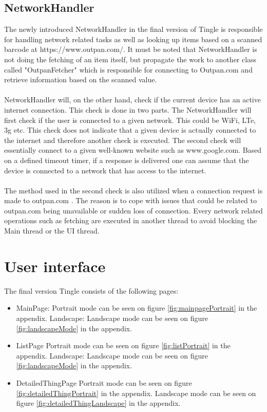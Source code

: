 \documentclass{article}
\begin{document}
\subsection{NetworkHandler}
The newly introduced NetworkHandler in the final version of Tingle is responsible for handling network related tasks as well as looking up items based on a scanned barcode at https://www.outpan.com/.   It must be noted that NetworkHandler is not doing the fetching of an item itself, but propagate the work to another class called "OutpanFetcher" which is responsible for connecting to Outpan.com and retrieve information based on the scanned value.  \\\\NetworkHandler will, on the other hand, check if the current device has an active internet connection. This check is done in two parts. The NetworkHandler will first check if the user is connected to a given network. This could be WiFi, LTe, 3g etc. This check does not indicate that a given device is actually connected to the internet and therefore another check is executed. The second check will essentially connect to a given well-known website such as www.google.com. Based on a defined timeout timer, if a response is delivered one can assume that the device is connected to a network that has access to the internet.
\\\\The method used in the second check is also utilized when a connection request is made to outpan.com . The reason is to cope with issues that could be related to outpan.com being unavailable or sudden loss of connection. Every network related operations such as fetching are executed in another thread to avoid blocking the Main thread or the UI thread.

\pagebreak
\section{User interface}

The final version Tingle consists of the following pages:
\begin{itemize}
	\item MainPage:
	\subitem Portrait mode can be seen on figure \ref{fig:mainpagePortrait} in the appendix.
	\subitem Landscape: Landscape mode can be seen on figure \ref{fig:landscapeMode} in the appendix.
	\item ListPage
	\subitem Portrait mode can be seen on figure \ref{fig:listPortrait} in the appendix.
	\subitem Landscape: Landscape mode can be seen on figure \ref{fig:landscapeMode} in the appendix.
	\item DetailedThingPage
	\subitem Portrait mode can be seen on figure \ref{fig:detailedThingPortrait} in the appendix.
	\subitem Landscape mode can be seen on figure \ref{fig:detailedThingLandscape} in the appendix.
\end{itemize}
\end{document}
